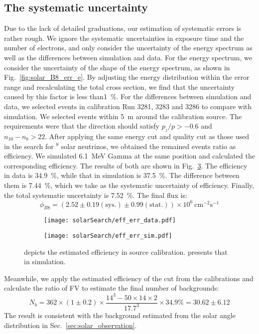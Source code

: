 \subsection{The systematic uncertainty}
Due to the lack of detailed graduations, our estimation of systematic errors is rather rough. We ignore the systematic uncertainties in exposure time and the number of electrons, and only consider the uncertainty of the energy spectrum as well as the differences between simulation and data. For the energy spectrum, we consider the uncertainty of the shape of the energy spectrum, as shown in Fig.~\ref{fig:solar_B8_err_e}. By adjusting the energy distribution within the error range and recalculating the total cross section, we find that the uncertainty caused by this factor is less than\SI{1}{\%}.
For the differences between simulation and data, we selected events in calibration Run 3281, 3283 and 3286 to compare with simulation.
We selected events within \SI{5}{m} around the calibration source. The requirements were that the direction should satisfy $p_z/p > - 0.6$ and $n_{10}-n_{b}>22$. After applying the same energy cut and quality cut as those used in the search for $^8$ solar neutrinos, we obtained the remained events ratio as efficiency. We simulated \SI{6.1}{MeV} Gamma at the same position and calculated the corresponding efficiency. The results of both are shown in Fig.~\ref{fig:solar_efficiency}. The efficiency in data is \SI{34.9}{\%}, while that in simulation is \SI{37.5}{\%}. The difference between them is \SI{7.44}{\%}, which we take as the systematic uncertainty of efficiency. Finally, the total systematic uncertainty is \SI{7.52}{\%}. The final flux is:$$\phi_{B8}=(2.52\pm0.19(\text{sys.})\pm0.99(\text{stat.}))\times10^6~\text{cm}^{-2}\text{s}^{-1}$$
\begin{figure}[htbp]
	\centering
	\begin{subfigure}{0.5\textwidth}
		\centering
		\texttt{[image: solarSearch/eff\_err\_data.pdf]}
		\caption{}
		\label{fig:solar_efficiency_data}
	\end{subfigure}%
	\begin{subfigure}{0.5\textwidth}
		\centering
		\texttt{[image: solarSearch/eff\_err\_sim.pdf]}
		\caption{}
		\label{fig:solar_efficiency_sim}
	\end{subfigure}
	\caption{ depicts the estimated efficiency in source calibration.  presents that in simulation.}
	\label{fig:solar_efficiency}
\end{figure}
Meanwhile, we apply the estimated efficiency of the cut from the calibrations and calculate the ratio of FV to estimate the final number of backgrounds:
\begin{equation}
	N_b=362\times(1\pm0.2)\times\frac{14^3-50\times14\times2}{17.7^3}\times34.9\%=30.62\pm6.12
	\label{eq:solar_background_final}
\end{equation}
The result is consistent with the background estimated from the solar angle distribution in Sec.~\ref{sec:solar_observation}.

